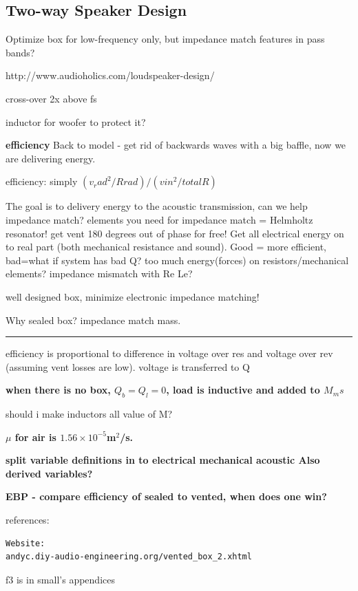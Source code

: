 \documentclass[10pt]{book}
\begin{document}
\subsection{Two-way Speaker Design}
Optimize box for low-frequency only, but impedance match features in pass bands?

http://www.audioholics.com/loudspeaker-design/

cross-over 2x above fs

inductor for woofer to protect it?

\textbf{efficiency}
Back to model - get rid of backwards waves with a big baffle, now we are delivering energy.

efficiency: simply $(v_rad^2/Rrad) / (vin^2/totalR)$

The goal is to delivery energy to the acoustic transmission, can we help impedance match? elements you need for impedance match = Helmholtz resonator! get vent 180 degrees out of phase for free! Get all electrical energy on to real part (both mechanical resistance and sound). Good = more efficient, bad=what if system has bad Q? too much energy(forces) on resistors/mechanical elements? impedance mismatch with Re Le?

well designed box, minimize electronic impedance matching!

Why sealed box? impedance match mass.


\hrule

efficiency is proportional to difference in voltage over res and voltage over rev (assuming vent losses are low). voltage is transferred to Q

\textbf{when there is no box, $Q_b=Q_l=0$, load is inductive and added to $M_ms$}

should i make inductors all value of M?


\textbf{$\mu$ for air is $1.56\times10^{-5}$m$^2$/s.}

\textbf{split variable definitions in to electrical mechanical acoustic Also derived variables?}

\textbf{EBP - compare efficiency of sealed to vented, when does one win?}

references:
\begin{verbatim}
Website:
andyc.diy-audio-engineering.org/vented_box_2.xhtml
\end{verbatim}
f3 is in small's appendices

\appendix
\end{document}
